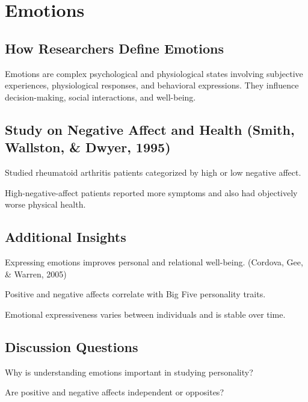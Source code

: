 \section{Emotions}  
\subsection{How Researchers Define Emotions}  
Emotions are complex psychological and physiological states involving subjective experiences, physiological responses, and behavioral expressions. They influence decision-making, social interactions, and well-being.  

\subsection{Study on Negative Affect and Health (Smith, Wallston, \& Dwyer, 1995)}  
\begin{coloredlist}  
    \item Studied rheumatoid arthritis patients categorized by high or low negative affect.  
    \item High-negative-affect patients reported more symptoms and also had objectively worse physical health.  
\end{coloredlist}  

\subsection{Additional Insights}  
\begin{coloredlist}  
    \item Expressing emotions improves personal and relational well-being. (Cordova, Gee, \& Warren, 2005)  
    \item Positive and negative affects correlate with Big Five personality traits.  
    \item Emotional expressiveness varies between individuals and is stable over time.  
\end{coloredlist}  

\subsection{Discussion Questions}  
\begin{coloredlist}  
    \item Why is understanding emotions important in studying personality?  
    \item Are positive and negative affects independent or opposites?  
\end{coloredlist}  

